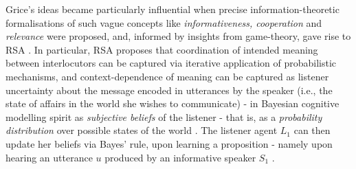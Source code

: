 Grice’s ideas became particularly influential when precise information-theoretic formalisations of such vague concepts like \emph{informativeness, cooperation} and \emph{relevance} were proposed, and, informed by insights from game-theory, gave rise to RSA \parencite{frank2012predicting}.
In particular, RSA proposes that coordination of intended meaning between interlocutors can be captured via iterative application of probabilistic mechanisms, and context-dependence of meaning can be captured as listener uncertainty about the message encoded in utterances by the speaker (i.e., the state of affairs in the world she wishes to communicate) - in Bayesian cognitive modelling spirit as \emph{subjective beliefs} of the listener - that is, as a \emph{probability distribution} over possible states of the world \parencite{tenenbaum2011grow}. The listener agent $L_1$ can then update her beliefs via Bayes' rule, upon learning a proposition - namely upon hearing an utterance $u$ produced by an informative speaker $S_1$ \parencite{frank2012predicting}.

